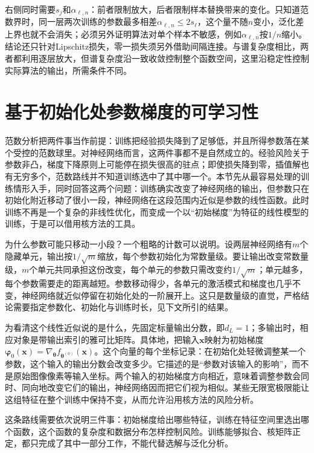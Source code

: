右侧同时需要$s_j$和$\alpha_{\ell,n}$：前者限制放大，后者限制样本替换带来的变化。只知道范数界时，同一层两次训练的参数最多相差$\alpha_{\ell,n}\leq2s_\ell$，这个量不随$n$变小，泛化差上界也就不会消失；必须另外证明算法对单个样本不敏感，例如$\alpha_{\ell,n}$按$1/n$缩小。结论还只针对Lipschitz损失，零一损失须另外借助间隔连接。与谱复杂度相比，两者都利用逐层放大，但谱复杂度沿一致收敛控制整个函数空间，这里沿稳定性控制实际算法的输出，所需条件不同。

\section{基于初始化处参数梯度的可学习性}
\label{sec:neural-tangent-kernel}

范数分析把两件事当作前提：训练把经验损失降到了足够低，并且所得参数落在某个受控的范数球里。对神经网络而言，这两件事都不是自然成立的。经验风险关于参数非凸，梯度下降原则上可能停在损失很高的驻点；即使损失降到零，插值解也有无穷多个，范数路线并不知道训练选中了其中哪一个。本节先从最容易处理的训练情形入手，同时回答这两个问题：训练确实改变了神经网络的输出，但参数只在初始化附近移动了很小一段，神经网络在这段范围内近似是参数的线性函数。此时训练不再是一个复杂的非线性优化，而变成一个以“初始梯度”为特征的线性模型的训练，于是可以借用核方法的工具。

为什么参数可能只移动一小段？一个粗略的计数可以说明。设两层神经网络有$m$个隐藏单元，输出按$1/\sqrt m$缩放，每个参数初始化为常数量级。要让输出改变常数量级，$m$个单元共同承担这份改变，每个单元的参数只需改变约$1/\sqrt m$；单元越多，每个参数需要走的距离越短。参数移动得少，各单元的激活模式和梯度也几乎不变，神经网络就近似停留在初始化处的一阶展开上。这只是数量级的直觉，严格结论需要指定参数化、初始化与训练时长，见下文所引的结果。

为看清这个线性近似说的是什么，先固定标量输出分数，即$d_L=1$；多输出时，相应对象是带输出索引的雅可比矩阵。具体地，把输入$\bm x$映射为初始梯度$\bm\varphi_0(\bm x)=\nabla_{\bm\theta}f_{\bm\theta^{(0)}}(\bm x)$。这个向量的每个坐标记录：在初始化处轻微调整某一个参数，这个输入的输出分数会改变多少。它描述的是“参数对该输入的影响”，而不是原始图像像素等输入坐标。两个输入的初始梯度方向相近，意味着调整参数会同时、同向地改变它们的输出，神经网络因而把它们视为相似。某些无限宽极限能让这组特征在整个训练中保持不变，从而允许沿用核方法的风险分析。

这条路线需要依次说明三件事：初始梯度给出哪些特征，训练在特征空间里选出哪个函数，这个函数的复杂度和数据分布怎样控制风险。训练能够拟合、核矩阵正定，都只完成了其中一部分工作，不能代替选解与泛化分析。

